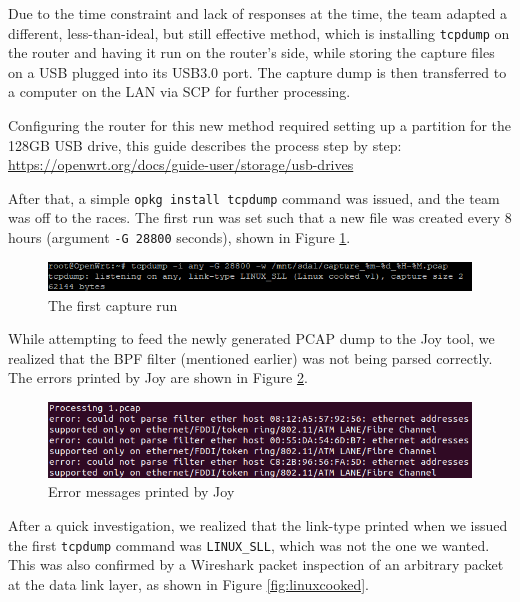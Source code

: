 \documentclass{article}
\begin{document}
Due to the time constraint and lack of responses at the time, the team
adapted a different, less-than-ideal, but still effective method, which
is installing \texttt{tcpdump} on the router and having it run on the router's
side, while storing the capture files on a USB plugged into its USB3.0
port. The capture dump is then transferred to a computer on the LAN via
SCP for further processing.\newline

Configuring the router for this new method required setting up a
partition for the 128GB USB drive, this guide describes the process step
by step: \url{https://openwrt.org/docs/guide-user/storage/usb-drives}\newline

After that, a simple \texttt{opkg install tcpdump} command was issued, and the
team was off to the races. The first run was set such that a new file
was created every 8 hours (argument \texttt{-G 28800} seconds), shown in Figure \ref{fig:firstrun}.\newline

\begin{figure}[!ht]
    \centering
    \includegraphics[width=15cm]{InputSystem/FirstRun.png}
    \caption{The first capture run} 
    \label{fig:firstrun}
\end{figure}


While attempting to feed the newly generated PCAP dump to the Joy tool,
we realized that the BPF filter (mentioned earlier) was not being parsed
correctly. The errors printed by Joy are shown in Figure \ref{fig:investigation}.\newline

\begin{figure}[!ht]
    \centering
    \includegraphics[width=15cm]{InputSystem/BPFerror.png}
    \caption{Error messages printed by Joy} 
    \label{fig:investigation}
\end{figure}

After a quick investigation, we realized that the link-type printed when
we issued the first \texttt{tcpdump} command was \texttt{LINUX\_SLL}, which was not the
one we wanted. This was also confirmed by a Wireshark packet inspection
of an arbitrary packet at the data link layer, as shown in Figure \ref{fig:linuxcooked}.\newline
\end{document}
